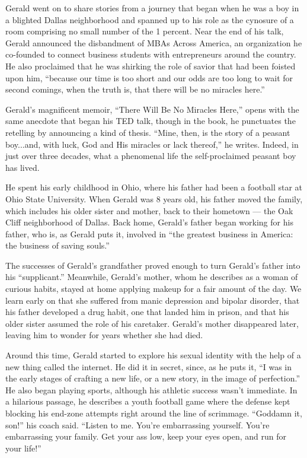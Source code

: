 Gerald went on to share stories from a journey that began when he was a
boy in a blighted Dallas neighborhood and spanned up to his role as the
cynosure of a room comprising no small number of the 1 percent. Near the
end of his talk, Gerald announced the disbandment of MBAs Across
America, an organization he co-founded to connect business students with
entrepreneurs around the country. He also proclaimed that he was
shirking the role of savior that had been foisted upon him, ``because
our time is too short and our odds are too long to wait for second
comings, when the truth is, that there will be no miracles here.''

Gerald's magnificent memoir, ``There Will Be No Miracles Here,'' opens
with the same anecdote that began his TED talk, though in the book, he
punctuates the retelling by announcing a kind of thesis. ``Mine, then,
is the story of a peasant boy...and, with luck, God and His miracles or
lack thereof,'' he writes. Indeed, in just over three decades, what a
phenomenal life the self-proclaimed peasant boy has lived.

He spent his early childhood in Ohio, where his father had been a
football star at Ohio State University. When Gerald was 8 years old, his
father moved the family, which includes his older sister and mother,
back to their hometown --- the Oak Cliff neighborhood of Dallas. Back
home, Gerald's father began working for his father, who is, as Gerald
puts it, involved in ``the greatest business in America: the business of
saving souls.''

The successes of Gerald's grandfather proved enough to turn Gerald's
father into his ``supplicant.'' Meanwhile, Gerald's mother, whom he
describes as a woman of curious habits, stayed at home applying makeup
for a fair amount of the day. We learn early on that she suffered from
manic depression and bipolar disorder, that his father developed a drug
habit, one that landed him in prison, and that his older sister assumed
the role of his caretaker. Gerald's mother disappeared later, leaving
him to wonder for years whether she had died.

Around this time, Gerald started to explore his sexual identity with the
help of a new thing called the internet. He did it in secret, since, as
he puts it, ``I was in the early stages of crafting a new life, or a new
story, in the image of perfection.'' He also began playing sports,
although his athletic success wasn't immediate. In a hilarious passage,
he describes a youth football game where the defense kept blocking his
end-zone attempts right around the line of scrimmage. ``Goddamn it,
son!'' his coach said. ``Listen to me. You're embarrassing yourself.
You're embarrassing your family. Get your ass low, keep your eyes open,
and run for your life!''


